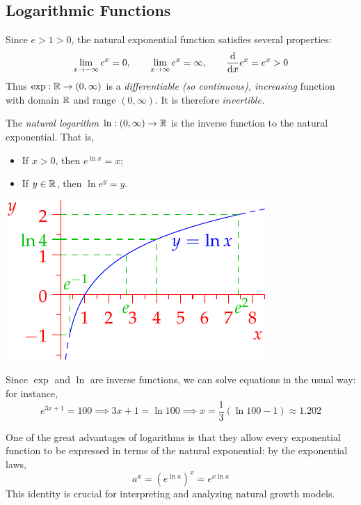 \clearpage



\subsection{Logarithmic Functions}

Since $e>1>0$, the natural exponential function satisfies several properties:
\[
	\lim_{x\to -\infty}e^x=0,\qquad \lim_{x\to\infty}e^x=\infty,\qquad \frac{\mathrm{d} }{\mathrm{d} x}e^x=e^x>0
\]
Thus $\exp:\mathbb{R}\to(0,\infty)$ is a \emph{differentiable (so continuous), increasing} function with domain $\mathbb{R}$ and range $(0,\infty)$. It is therefore \emph{invertible.}


\begin{defn}[lower separated=false, sidebyside, sidebyside align=top seam, sidebyside gap=0pt, righthand width=0.4\linewidth]{}{}
	The \emph{natural logarithm} $\ln:(0,\infty)\to\mathbb{R}$ is the inverse function to the natural exponential. That is,
	\begin{itemize}
		\item If $x>0$, then $e^{\ln x}=x$;
		\item If $y\in\mathbb{R}$, then $\ln e^y=y$.
	\end{itemize}
	\tcblower
	\flushright\includegraphics{log}
\end{defn}

Since $\exp$ and $\ln$ are inverse functions, we can solve equations in the usual way: for instance,
\[
	e^{3x+1}=100 \implies 3x+1=\ln 100
	\implies x=\frac 13(\ln 100-1) \approx 1.202
\]



One of the great advantages of logarithms is that they allow every exponential function to be expressed in terms of the natural exponential: by the exponential laws,
\[
	a^x=(e^{\ln a})^x=e^{x\ln a}
\]
This identity is crucial for interpreting and analyzing natural growth models.


